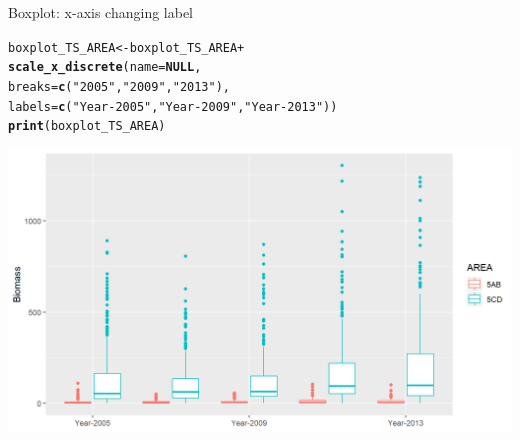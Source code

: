 \documentclass{beamer}\usepackage[]{graphicx}\usepackage[]{color}
\makeatletter
\newcommand{\hlstr}[1]{\textcolor[rgb]{0.192,0.494,0.8}{#1}}%
\newcommand{\hlopt}[1]{\textcolor[rgb]{0,0,0}{#1}}%
\newcommand{\hlstd}[1]{\textcolor[rgb]{0.345,0.345,0.345}{#1}}%
\newcommand{\hlkwa}[1]{\textcolor[rgb]{0.161,0.373,0.58}{\textbf{#1}}}%
\newcommand{\hlkwb}[1]{\textcolor[rgb]{0.69,0.353,0.396}{#1}}%
\newcommand{\hlkwc}[1]{\textcolor[rgb]{0.333,0.667,0.333}{#1}}%
\newcommand{\hlkwd}[1]{\textcolor[rgb]{0.737,0.353,0.396}{\textbf{#1}}}%
\newenvironment{kframe}{%
 \def\at@end@of@kframe{}%
 \ifinner\ifhmode%
  \def\at@end@of@kframe{\end{minipage}}%
  \begin{minipage}{\columnwidth}%
 \fi\fi%
 \def\FrameCommand##1{\hskip\@totalleftmargin \hskip-\fboxsep
 \colorbox{shadecolor}{##1}\hskip-\fboxsep
     \hskip-\linewidth \hskip-\@totalleftmargin \hskip\columnwidth}%
 \MakeFramed {\advance\hsize-\width
   \@totalleftmargin\z@ \linewidth\hsize
   \@setminipage}}%
 {\par\unskip\endMakeFramed%
 \at@end@of@kframe}
\newenvironment{knitrout}{}{} %
\makeatother
\begin{document}
\begin{frame}[fragile]{Boxplot: x-axis changing label}
\begin{knitrout}\footnotesize
{}\color{fgcolor}\begin{kframe}
\begin{alltt}
\hlstd{boxplot_TS_AREA} \hlkwb{<-} \hlstd{boxplot_TS_AREA} \hlopt{+}
  \hlkwd{scale_x_discrete}\hlstd{(}\hlkwc{name}\hlstd{=}\hlkwa{NULL}\hlstd{,}
                   \hlkwc{breaks}\hlstd{=}\hlkwd{c}\hlstd{(}\hlstr{"2005"}\hlstd{,} \hlstr{"2009"}\hlstd{,} \hlstr{"2013"}\hlstd{),}
                   \hlkwc{labels}\hlstd{=}\hlkwd{c}\hlstd{(}\hlstr{"Year-2005"}\hlstd{,} \hlstr{"Year-2009"}\hlstd{,} \hlstr{"Year-2013"}\hlstd{))}
\hlkwd{print}\hlstd{(boxplot_TS_AREA)}
\end{alltt}
\end{kframe}

{\centering \includegraphics[width=.9\linewidth]{figure/boxplot_TSf_AREA_xaxis-1} 

}



\end{knitrout}
\end{frame}
\end{document}
